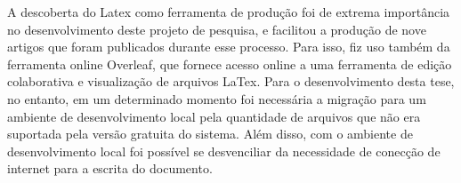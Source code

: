 A descoberta do Latex como ferramenta de produção foi de extrema importância no desenvolvimento deste projeto de pesquisa, e facilitou a produção de nove artigos que foram publicados durante esse processo. Para isso, fiz uso também da ferramenta online Overleaf, que fornece acesso online a uma ferramenta de edição colaborativa e visualização de arquivos LaTex. Para o desenvolvimento desta tese, no entanto, em um determinado momento foi necessária a migração para um ambiente de desenvolvimento local pela quantidade de arquivos que não era suportada pela versão gratuita do sistema. Além disso, com o ambiente de desenvolvimento local foi possível se desvenciliar da necessidade de conecção de internet para a escrita do documento.

\subsection{}








